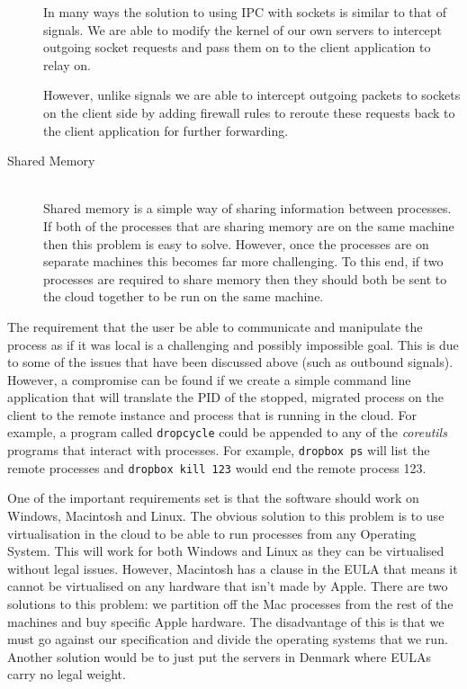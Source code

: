 \documentclass[12pt, a4paper]{article}
\begin{document}
\begin{description}
	In many ways the solution to using IPC with sockets is similar to that of
	signals. We are able to modify the kernel of our own servers to intercept
	outgoing socket requests and pass them on to the client application to
	relay on.

	However, unlike signals we are able to intercept outgoing packets to sockets
	on the client side by adding firewall rules to reroute these requests back to
	the client application for further forwarding.

	\item[Shared Memory] \\

	Shared memory is a simple way of sharing information between processes. If
	both of the processes that are sharing memory are on the same machine then
	this problem is easy to solve. However, once the processes are on separate
	machines this becomes far more challenging. To this end, if two processes
	are required to share memory then they should both be sent to the cloud
	together to be run on the same machine.

\end{description}

The requirement that the user be able to communicate and manipulate the process
as if it was local is a challenging and possibly impossible goal. This is due
to some of the issues that have been discussed above (such as outbound
signals). However, a compromise can be found if we create a simple command line
application that will translate the PID of the stopped, migrated process on the
client to the remote instance and process that is running in the cloud. For
example, a program called \texttt{dropcycle} could be appended to any of the
\emph{coreutils} programs that interact with processes. For example,
\texttt{dropbox ps} will list the remote processes and \texttt{dropbox kill
123} would end the remote process 123.

One of the important requirements set is that the software should work on
Windows, Macintosh and Linux. The obvious solution to this problem is to use
virtualisation in the cloud to be able to run processes from any Operating
System. This will work for both Windows and Linux as they can be virtualised
without legal issues. However, Macintosh has a clause in the EULA that means it
cannot be virtualised on any hardware that isn't made by Apple. There are two
solutions to this problem: we partition off the Mac processes from the rest of
the machines and buy specific Apple hardware. The disadvantage of this is that
we must go against our specification and divide the operating systems that we
run. Another solution would be to just put the servers in Denmark where EULAs
carry no legal weight.
\end{document}
